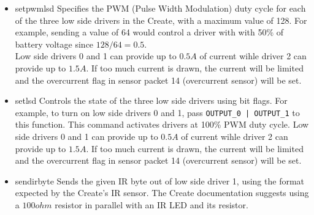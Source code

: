 \documentclass {article}
\begin{document}
\begin {itemize}
  \item {} {setpwmlsd}
        Specifies the PWM (Pulse Width Modulation) duty cycle for each of the three low side drivers
        in the Create, with a maximum value of 128.  For example, sending a value of 64 would
        control a driver with with 50\% of battery voltage since $128/64 = 0.5$. \\
        Low side drivers 0 and 1 can provide up to $0.5A$ of current wihle driver 2 can provide up
        to $1.5A$.  If too much current is drawn, the current will be limited and the overcurrent
        flag in sensor packet 14 (overcurrent sensor) will be set. \\
        \retnorm

  \item {} {setlsd}
        Controls the state of the three low side drivers using bit flags.  For example, to turn on
        low side drivers 0 and 1, pass {\tt OUTPUT\_0 | OUTPUT\_1} to this function.  This command
        activates drivers at 100\% PWM duty cycle.  Low side drivers 0 and 1 can provide up to
        $0.5A$ of current wihle driver 2 can provide up to $1.5A$.  If too much current is drawn,
        the current will be limited and the overcurrent flag in sensor packet 14 (overcurrent
        sensor) will be set. \\
        \retnorm

  \item {} {sendirbyte}
        Sends the given IR byte out of low side driver 1, using the format expected by the Create's
        IR sensor.  The Create documentation suggests using a $100ohm$ resistor in parallel with an
        IR LED and its resistor. \\
        \retnorm


\end{itemize}
\end{document}

